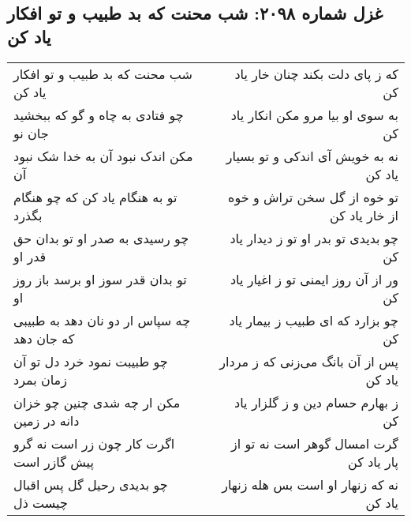 \begin{center}
\section*{غزل شماره ۲۰۹۸: شب محنت که بد طبیب و تو افکار یاد کن}
\label{sec:2098}
\begin{longtable}{l p{0.5cm} r}
شب محنت که بد طبیب و تو افکار یاد کن
&&
که ز پای دلت بکند چنان خار یاد کن
\\
چو فتادی به چاه و گو که ببخشید جان نو
&&
به سوی او بیا مرو مکن انکار یاد کن
\\
مکن اندک نبود آن به خدا شک نبود آن
&&
نه به خویش آی اندکی و تو بسیار یاد کن
\\
تو به هنگام یاد کن که چو هنگام بگذرد
&&
تو خوه از گل سخن تراش و خوه از خار یاد کن
\\
چو رسیدی به صدر او تو بدان حق قدر او
&&
چو بدیدی تو بدر او تو ز دیدار یاد کن
\\
تو بدان قدر سوز او برسد باز روز او
&&
ور از آن روز ایمنی تو ز اغیار یاد کن
\\
چه سپاس ار دو نان دهد به طبیبی که جان دهد
&&
چو بزارد که ای طبیب ز بیمار یاد کن
\\
چو طبیبت نمود خرد دل تو آن زمان بمرد
&&
پس از آن بانگ می‌زنی که ز مردار یاد کن
\\
مکن ار چه شدی چنین چو خزان دانه در زمین
&&
ز بهارم حسام دین و ز گلزار یاد کن
\\
اگرت کار چون زر است نه گرو پیش گازر است
&&
گرت امسال گوهر است نه تو از پار یاد کن
\\
چو بدیدی رحیل گل پس اقبال چیست ذل
&&
نه که زنهار او است بس هله زنهار یاد کن
\\
\end{longtable}
\end{center}
